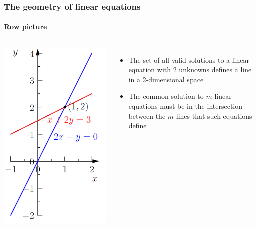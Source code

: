 \documentclass[compress]{beamer}
\begin{document}
\begin{frame}
\frametitle{The geometry of linear equations}
\framesubtitle{Row picture}

\begin{columns}
\begin{center}
\includegraphics[trim = 5mm 5mm 5mm 1mm, clip, width=.6\textwidth]{./img/row-pic}
\end{center}
\begin{itemize}
\item The set of all valid solutions to a linear equation with $2$ unknowns defines a line in a 2-dimensional space
\vspace{.2cm}
\item The common solution to $m$ linear equations must be in the intersection between the $m$ lines that such equations define
\end{itemize}
\end{columns}

\end{frame}

\end{document}
